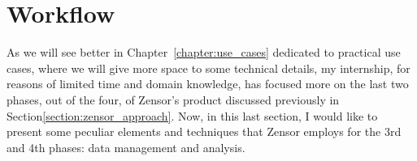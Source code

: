 \section{Workflow}\label{section:workflow}
As we will see better in Chapter~\ref{chapter:use_cases} dedicated to practical use cases, where we will give more space to some technical details, 
my internship, for reasons of limited time and domain knowledge, has focused more on the last two phases, out of the four, of Zensor's product discussed previously in Section\ref{section:zensor_approach}. 
Now, in this last section, I would like to present some peculiar elements and techniques that Zensor employs for the 3rd and 4th phases: data management and analysis.

